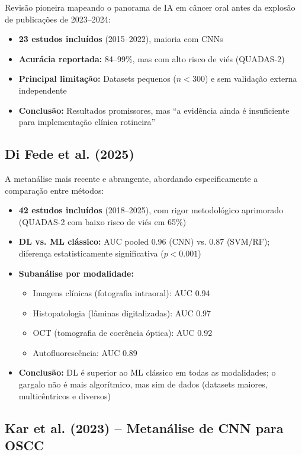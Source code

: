 Revisão pioneira mapeando o panorama de IA em câncer oral antes da explosão de
publicações de 2023--2024:
\begin{itemize}
  \item \textbf{23 estudos incluídos} (2015--2022), maioria com CNNs
  \item \textbf{Acurácia reportada:} 84--99\%, mas com alto risco de viés (QUADAS-2)
  \item \textbf{Principal limitação:} Datasets pequenos ($n < 300$) e sem validação
        externa independente
  \item \textbf{Conclusão:} Resultados promissores, mas ``a evidência ainda é
        insuficiente para implementação clínica rotineira''
\end{itemize}

\subsection{Di Fede et al. (2025)}

A metanálise mais recente e abrangente, abordando especificamente a comparação
entre métodos:
\begin{itemize}
  \item \textbf{42 estudos incluídos} (2018--2025), com rigor metodológico
        aprimorado (QUADAS-2 com baixo risco de viés em 65\%)
  \item \textbf{DL vs. ML clássico:} AUC pooled 0.96 (CNN) vs. 0.87 (SVM/RF);
        diferença estatisticamente significativa ($p < 0.001$)
  \item \textbf{Subanálise por modalidade:}
        \begin{itemize}
          \item Imagens clínicas (fotografia intraoral): AUC 0.94
          \item Histopatologia (lâminas digitalizadas): AUC 0.97
          \item OCT (tomografia de coerência óptica): AUC 0.92
          \item Autofluorescência: AUC 0.89
        \end{itemize}
  \item \textbf{Conclusão:} DL é superior ao ML clássico em todas as modalidades;
        o gargalo não é mais algorítmico, mas sim de dados (datasets maiores,
        multicêntricos e diversos)
\end{itemize}

\subsection{Kar et al. (2023) -- Metanálise de CNN para OSCC}

